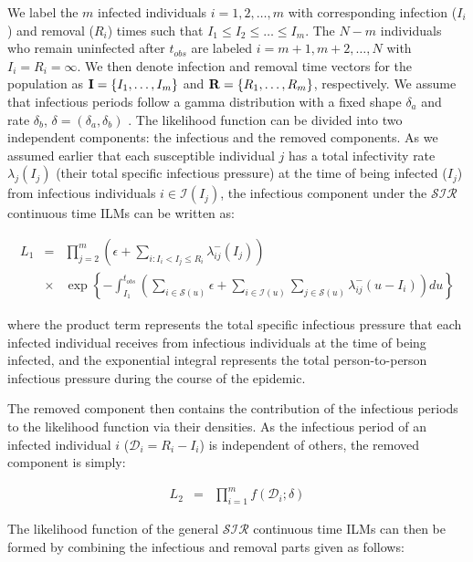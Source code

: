 \documentclass[nojss,shortnames]{jss}
\begin{document}
We label the $m$ infected individuals $i = 1, 2, \dots, m$ with corresponding infection ($I_{i}$) and removal ($R_{i}$) times such that $I_{1} \leq I_{2} \leq \dots \leq I_{m}$. The $N-m$ individuals who remain uninfected after $t_{obs}$ are labeled $i = m + 1, m + 2, \dots, N$ with $I_{i}= R_{i} = \infty$. We then denote infection and removal time vectors for the population as ${\bf I} = \{I_{1}, \dots, I_{m}\}$ and ${\bf R} = \{R_{1}, \dots, R_{m}\}$, respectively. We assume that infectious periods follow a gamma distribution with a fixed shape $\delta_{a}$ and rate $\delta_{b}$, $\delta = (\delta_{a}, \delta_{b})$ \citep{jewell2009bayesian}. 
The likelihood function can be divided into two independent components: the infectious and the removed components. As we assumed earlier that each susceptible individual $j$ has a total infectivity rate $\lambda_{j}(I_{j})$ (their total specific infectious pressure) at the time of being infected ($I_{j}$) from infectious individuals $i \in \mathcal{I}(I_{j})$, the infectious component under the $\mathcal{SIR}$ continuous time ILMs can be written as:

{\small
\begin{eqnarray}
L_{1}&=&\prod_{j=2}^{m}{\left(\epsilon +\sum_{i:I_{i} < I_{j} \leq R_{i}}{\lambda_{ij}^{-}(I_{j})} \right)}\nonumber\\
&\times& \exp \left\{ -\int_{I_{1}}^{t_{obs}}{\left(\sum_{i \in \mathcal{S}(u)}{\epsilon}  +  \sum_{i \in \mathcal{I}(u)}\sum_{j \in \mathcal{S}(u)}{\lambda_{ij}^{-}(u-I_{i})}  \right) du} \right\}\nonumber 
\end{eqnarray}
}

\noindent where the product term represents the total specific infectious pressure that each infected individual receives from infectious individuals at the time of being infected, and the exponential integral represents the total person-to-person infectious pressure during the course of the epidemic. 

The removed component then contains the contribution of the infectious periods to the likelihood function via their densities. As the infectious period of an infected individual $i$ ($\mathcal{D}_{i} = R_{i} - I_{i}$) is independent of others, the removed component is simply:

{\small
\begin{eqnarray}
L_{2} &=& 
\prod_{i=1}^{m}{f(\mathcal{D}_{i};\delta)} \nonumber
\end{eqnarray}
}

The likelihood function of the general $\mathcal{SIR}$ continuous time ILMs can then be formed by combining the infectious and removal parts given as follows:
\end{document}
